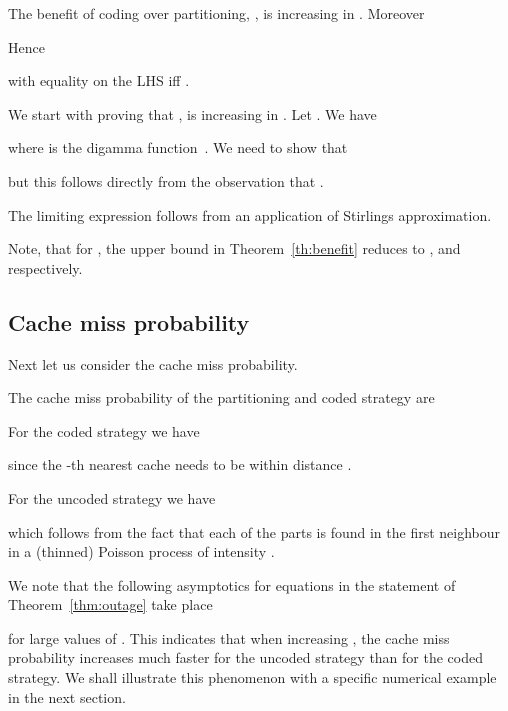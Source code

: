 \begin{theorem} \label{th:benefit}
The benefit of coding over partitioning, , is increasing in . Moreover

Hence

with equality on the LHS iff .
\end{theorem}
\begin{IEEEproof}
We start with proving that , is increasing in .
Let . We have

where  is the digamma function~\cite{abramowitz1974handbook}. We need to show that

but this follows directly from the observation that .

The limiting expression follows from an application of Stirlings approximation.
\end{IEEEproof}
Note, that for , the upper bound in Theorem~\ref{th:benefit} reduces to ,  and  respectively.


\subsection{Cache miss probability}
Next let us consider the cache miss probability.
\begin{theorem}\label{thm:outage}
The cache miss probability of the partitioning and coded strategy are

\end{theorem}
\begin{IEEEproof}
For the coded strategy we have

since the -th nearest cache needs to be within distance .


For the uncoded strategy we have

which follows from the fact that each of the parts is found in the first neighbour in a (thinned) Poisson process of intensity .
\end{IEEEproof}

We note that the following asymptotics for equations in the statement of Theorem~\ref{thm:outage} take place


for large values of . This indicates that when increasing , the cache miss probability increases much faster for the uncoded
strategy than for the coded strategy. We shall illustrate this phenomenon with a specific numerical example in the next section.
